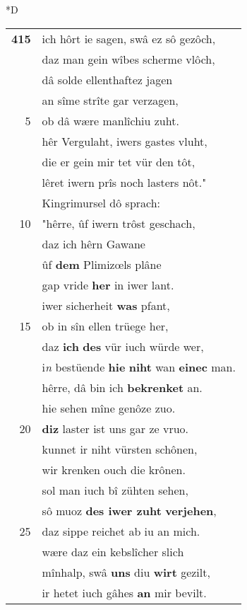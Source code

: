 \documentclass[8pt,a4paper,notitlepage]{article}
\begin{document}
\begin{table}[ht]
\begin{minipage}[t]{0.5\linewidth}
\small
\begin{center}*D
\end{center}
\begin{tabular}{rl}
\textbf{415} & ich hôrt ie sagen, swâ ez sô gezôch,\\ 
 & daz man gein wîbes scherme vlôch,\\ 
 & dâ solde ellenthaftez jagen\\ 
 & an sîme strîte gar verzagen,\\ 
5 & ob dâ wære manlîchiu zuht.\\ 
 & hêr Vergulaht, iwers gastes vluht,\\ 
 & die er gein mir tet vür den tôt,\\ 
 & lêret iwern prîs noch lasters nôt."\\ 
 & Kingrimursel dô sprach:\\ 
10 & "hêrre, ûf iwern trôst geschach,\\ 
 & daz ich hêrn Gawane\\ 
 & ûf \textbf{dem} Plimizœls plâne\\ 
 & gap vride \textbf{her} in iwer lant.\\ 
 & iwer sicherheit \textbf{was} pfant,\\ 
15 & ob in sîn ellen trüege her,\\ 
 & daz \textbf{ich} \textbf{des} vür iuch würde wer,\\ 
 & i\textit{n} bestüende \textbf{hie} \textbf{niht} wan \textbf{einec} man.\\ 
 & hêrre, dâ bin ich \textbf{bekrenket} an.\\ 
 & hie sehen mîne genôze zuo.\\ 
20 & \textbf{diz} laster ist uns gar ze vruo.\\ 
 & kunnet ir niht vürsten schônen,\\ 
 & wir krenken ouch die krônen.\\ 
 & sol man iuch bî zühten sehen,\\ 
 & sô muoz \textbf{des iwer zuht} \textbf{verjehen},\\ 
25 & daz sippe reichet ab iu an mich.\\ 
 & wære daz ein kebslîcher slich\\ 
 & mînhalp, swâ \textbf{uns} diu \textbf{wirt} gezilt,\\ 
 & ir hetet iuch gâhes \textbf{an} mir bevilt.\\ 

\end{tabular}
\end{minipage}
\end{table}
\end{document}
